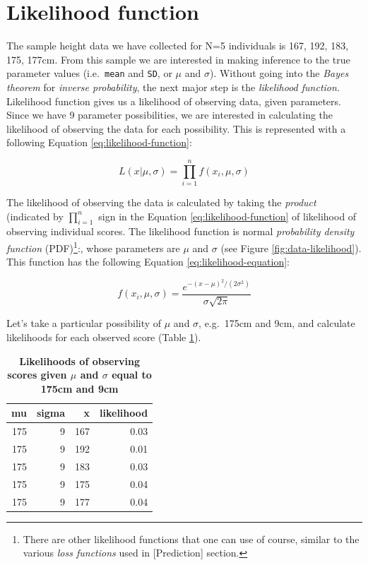 \documentclass[
]{book}
\begin{document}
\hypertarget{likelihood-function}{%
\section{Likelihood function}\label{likelihood-function}}

The sample height data we have collected for N=5 individuals is 167, 192, 183, 175, 177cm. From this sample we are interested in making inference to the true parameter values (i.e.~\texttt{mean} and \texttt{SD}, or \(\mu\) and \(\sigma\)). Without going into the \emph{Bayes theorem} for \emph{inverse probability}, the next major step is the \emph{likelihood function}. Likelihood function gives us a likelihood of observing data, given parameters. Since we have 9 parameter possibilities, we are interested in calculating the likelihood of observing the data for each possibility. This is represented with a following Equation \eqref{eq:likelihood-function}:

\begin{equation}
  L(x|\mu, \sigma) = \prod_{i=1}^{n}f(x_{i}, \mu, \sigma) 
  \label{eq:likelihood-function}
\end{equation}

The likelihood of observing the data is calculated by taking the \emph{product} (indicated by \(\prod_{i=1}^{n}\) sign in the Equation \eqref{eq:likelihood-function} of likelihood of observing individual scores. The likelihood function is normal \emph{probability density function} (PDF)\footnote{There are other likelihood functions that one can use of course, similar to the various \emph{loss functions} used in {[}Prediction{]} section.}:, whose parameters are \(\mu\) and \(\sigma\) (see Figure \ref{fig:data-likelihood}). This function has the following Equation \eqref{eq:likelihood-equation}:

\begin{equation}
  f(x_{i}, \mu, \sigma) = \frac{e^{-(x - \mu)^{2}/(2\sigma^{2}) }} {\sigma\sqrt{2\pi}}
  \label{eq:likelihood-equation}
\end{equation}

Let's take a particular possibility of \(\mu\) and \(\sigma\), e.g.~175cm and 9cm, and calculate likelihoods for each observed score (Table \ref{tab:bayes-height-grid-likelihood}).



\begin{table}

\caption{\label{tab:bayes-height-grid-likelihood}\textbf{Likelihoods of observing scores given \(\mu\) and \(\sigma\) equal to 175cm and 9cm}}
\centering
\begin{tabular}[t]{rrrr}
\toprule
mu & sigma & x & likelihood\\
\midrule
175 & 9 & 167 & 0.03\\
175 & 9 & 192 & 0.01\\
175 & 9 & 183 & 0.03\\
175 & 9 & 175 & 0.04\\
175 & 9 & 177 & 0.04\\
\bottomrule
\end{tabular}
\end{table}
\end{document}
